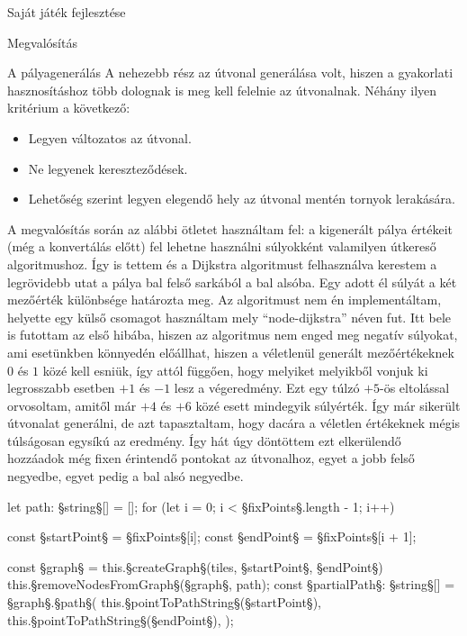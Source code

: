 \begin{MyChapter}{Saját játék fejlesztése}
\begin{MySection}{Megvalósítás}
\begin{MySubSection}{A pályagenerálás}
			A nehezebb rész az útvonal generálása volt, hiszen a gyakorlati hasznosításhoz több dolognak is meg kell felelnie az útvonalnak. Néhány ilyen kritérium a következő:
			\begin{itemize}
				\item Legyen változatos az útvonal.
				\item Ne legyenek kereszteződések.
				\item Lehetőség szerint legyen elegendő hely az útvonal mentén tornyok lerakására.
			\end{itemize}
			A megvalósítás során az alábbi ötletet használtam fel: a kigenerált pálya értékeit (még a konvertálás előtt) fel lehetne használni súlyokként valamilyen útkereső algoritmushoz. Így is tettem és a Dijkstra algoritmust \cite{dijkstra} felhasználva kerestem a legrövidebb utat a pálya bal felső sarkából a bal alsóba. Egy adott él súlyát a két mezőérték különbsége határozta meg. Az algoritmust nem én implementáltam, helyette egy külső csomagot használtam mely ``node-dijkstra'' néven fut. Itt bele is futottam az első hibába, hiszen az algoritmus nem enged meg negatív súlyokat, ami esetünkben könnyedén előállhat, hiszen a véletlenül generált mezőértékeknek $0$ és $1$ közé kell esniük, így attól függően, hogy melyiket melyikből vonjuk ki legrosszabb esetben $+1$ és $-1$ lesz a végeredmény. Ezt egy túlzó $+5$-ös eltolással orvosoltam, amitől már $+4$ és $+6$ közé esett mindegyik súlyérték. Így már sikerült útvonalat generálni, de azt tapasztaltam, hogy dacára a véletlen értékeknek mégis túlságosan egysíkú az eredmény. Így hát úgy döntöttem ezt elkerülendő hozzáadok még fixen érintendő pontokat az útvonalhoz, egyet a jobb felső negyedbe, egyet pedig a bal alsó negyedbe. 
			\begin{javascript}
let path: §\color{jsType}string§[] = [];
for (let i = 0; i < §\color{jsConst}fixPoints§.length - 1; i++) {
	const §\color{jsConst}startPoint§ = §\color{jsConst}fixPoints§[i];
	const §\color{jsConst}endPoint§ = §\color{jsConst}fixPoints§[i + 1];
	
	const §\color{jsConst}graph§ = this.§\color{jsMethod}createGraph§(tiles, §\color{jsConst}startPoint§, §\color{jsConst}endPoint§)
	this.§\color{jsMethod}removeNodesFromGraph§(§\color{jsConst}graph§, path);
	const §\color{jsConst}partialPath§: §\color{jsType}string§[] = §\color{jsConst}graph§.§\color{jsMethod}path§(
		this.§\color{jsMethod}pointToPathString§(§\color{jsConst}startPoint§),
		this.§\color{jsMethod}pointToPathString§(§\color{jsConst}endPoint§),
	);
	
}
\end{javascript}
\end{MySubSection}
\end{MySection}
\end{MyChapter}
